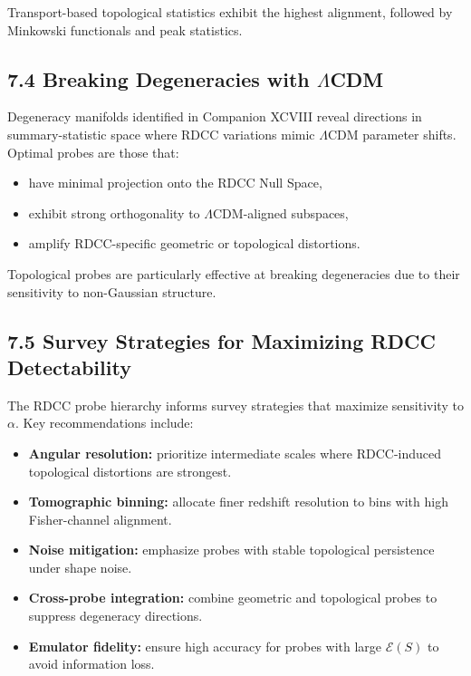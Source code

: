 \documentclass[11pt,a4paper]{article}
\begin{document}
Transport-based topological statistics exhibit the highest alignment, followed 
by Minkowski functionals and peak statistics.

\subsection*{7.4 Breaking Degeneracies with $\Lambda$CDM}

Degeneracy manifolds identified in Companion XCVIII reveal directions in 
summary-statistic space where RDCC variations mimic $\Lambda$CDM parameter 
shifts. Optimal probes are those that:

\begin{itemize}
    \item have minimal projection onto the RDCC Null Space,
    \item exhibit strong orthogonality to $\Lambda$CDM-aligned subspaces,
    \item amplify RDCC-specific geometric or topological distortions.
\end{itemize}

Topological probes are particularly effective at breaking degeneracies due to 
their sensitivity to non-Gaussian structure.

\subsection*{7.5 Survey Strategies for Maximizing RDCC Detectability}

The RDCC probe hierarchy informs survey strategies that maximize sensitivity to 
$\alpha$. Key recommendations include:

\begin{itemize}
    \item \textbf{Angular resolution:} prioritize intermediate scales where 
    RDCC-induced topological distortions are strongest.

    \item \textbf{Tomographic binning:} allocate finer redshift resolution to 
    bins with high Fisher-channel alignment.

    \item \textbf{Noise mitigation:} emphasize probes with stable topological 
    persistence under shape noise.

    \item \textbf{Cross-probe integration:} combine geometric and topological 
    probes to suppress degeneracy directions.

    \item \textbf{Emulator fidelity:} ensure high accuracy for probes with 
    large $\mathcal{E}(S)$ to avoid information loss.
\end{itemize}
\end{document}
